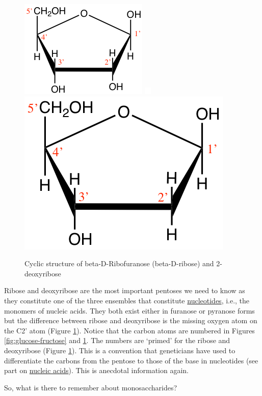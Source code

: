 \documentclass[]{book}
\theoremstyle{definition}
\theoremstyle{definition}
\theoremstyle{definition}
\theoremstyle{remark}
\begin{document}
\begin{figure}

{\centering \includegraphics[width=0.25\linewidth]{pictures/ribose-haworth} \includegraphics[width=0.25\linewidth]{pictures/blank} \includegraphics[width=0.25\linewidth]{pictures/deoxyribose-haworth} 

}

\caption{Cyclic structure of beta-D-Ribofuranose (beta-D-ribose) and 2-deoxyribose }\label{fig:riboses}
\end{figure}

Ribose and deoxyribose are the most important pentoses we need to know
as they constitute one of the three ensembles that constitute
\protect\hyperlink{Nucleic-acids}{nucleotides}, i.e., the monomers of
nucleic acids. They both exist either in furanose or pyranose forms but
the difference between ribose and deoxyribose is the missing oxygen atom
on the C2' atom (Figure \ref{fig:riboses}). Notice that the carbon atoms
are numbered in Figures \ref{fig:glucose-fructose} and
\ref{fig:riboses}. The numbers are `primed' for the ribose and
deoxyribose (Figure \ref{fig:riboses}). This is a convention that
geneticians have used to differentiate the carbons from the pentose to
those of the base in nucleotides (see part on
\protect\hyperlink{nucleic-acids}{nucleic acids}). This is anecdotal
information again.

So, what is there to remember about monosaccharides?
\end{document}
